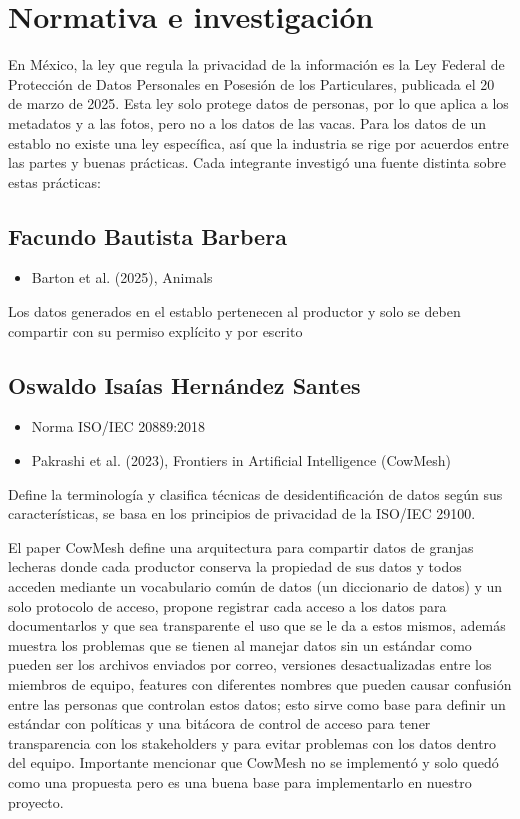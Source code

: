 \section{Normativa e investigación}

En México, la ley que regula la privacidad de la información es la Ley Federal de Protección de Datos Personales en Posesión de los Particulares, publicada el 20 de marzo de 2025. Esta ley solo protege datos de personas, por lo que aplica a los metadatos y a las fotos, pero no a los datos de las vacas. Para los datos de un establo no existe una ley específica, así que la industria se rige por acuerdos entre las partes y buenas prácticas. Cada integrante investigó una fuente distinta sobre estas prácticas:

\subsection{Facundo Bautista Barbera}

\begin{itemize}
  \item Barton et al. (2025), Animals
\end{itemize}

Los datos generados en el establo pertenecen al productor y solo se deben compartir con su permiso explícito y por escrito

\subsection{Oswaldo Isaías Hernández Santes}

\begin{itemize}
  \item Norma ISO/IEC 20889:2018
  \item Pakrashi et al. (2023), Frontiers in Artificial Intelligence (CowMesh)
\end{itemize}

Define la terminología y clasifica técnicas de desidentificación de datos según sus características, se basa en los principios de privacidad de la ISO/IEC 29100.

El paper CowMesh define una arquitectura para compartir datos de granjas lecheras donde cada productor conserva la propiedad de sus datos y todos acceden mediante un vocabulario común de datos (un diccionario de datos) y un solo protocolo de acceso, propone registrar cada acceso a los datos para documentarlos y que sea transparente el uso que se le da a estos mismos, además muestra los problemas que se tienen al manejar datos sin un estándar como pueden ser los archivos enviados por correo, versiones desactualizadas entre los miembros de equipo, features con diferentes nombres que pueden causar confusión entre las personas que controlan estos datos; esto sirve como base para definir un estándar con políticas y una bitácora de control de acceso para tener transparencia con los stakeholders y para evitar problemas con los datos dentro del equipo. Importante mencionar que CowMesh no se implementó y solo quedó como una propuesta pero es una buena base para implementarlo en nuestro proyecto.

